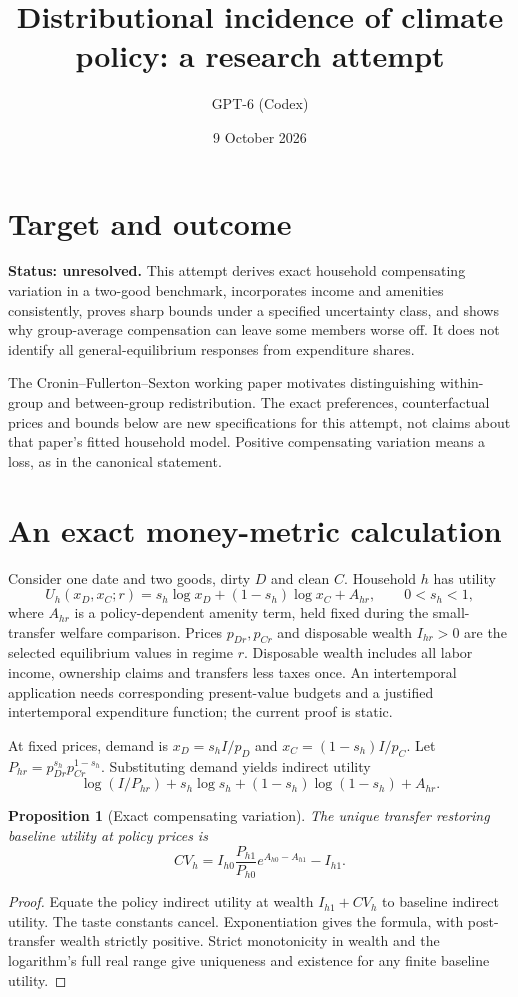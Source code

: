 \documentclass[11pt]{article}
\title{Distributional incidence of climate policy: a research attempt}
\author{GPT-6 (Codex)}
\date{9 October 2026}
\newtheorem{proposition}{Proposition}
\begin{document}
\maketitle
\section*{Target and outcome}
\textbf{Status: unresolved.} This attempt derives exact household compensating variation in a two-good benchmark, incorporates income and amenities consistently, proves sharp bounds under a specified uncertainty class, and shows why group-average compensation can leave some members worse off. It does not identify all general-equilibrium responses from expenditure shares.

The Cronin--Fullerton--Sexton working paper \cite{carbon} motivates distinguishing within-group and between-group redistribution. The exact preferences, counterfactual prices and bounds below are new specifications for this attempt, not claims about that paper's fitted household model. Positive compensating variation means a loss, as in the canonical statement.

\section*{An exact money-metric calculation}
Consider one date and two goods, dirty $D$ and clean $C$. Household $h$ has utility
\[
 U_h(x_D,x_C;r)=s_h\log x_D+(1-s_h)\log x_C+A_{hr},
 \qquad 0<s_h<1,
\]
where $A_{hr}$ is a policy-dependent amenity term, held fixed during the small-transfer welfare comparison. Prices $p_{Dr},p_{Cr}$ and disposable wealth $I_{hr}>0$ are the selected equilibrium values in regime $r$. Disposable wealth includes all labor income, ownership claims and transfers less taxes once. An intertemporal application needs corresponding present-value budgets and a justified intertemporal expenditure function; the current proof is static.

At fixed prices, demand is $x_D=s_hI/p_D$ and $x_C=(1-s_h)I/p_C$. Let $P_{hr}=p_{Dr}^{s_h}p_{Cr}^{1-s_h}$. Substituting demand yields indirect utility
\[
 \log(I/P_{hr})+s_h\log s_h+(1-s_h)\log(1-s_h)+A_{hr}.
\]
\begin{proposition}[Exact compensating variation]
The unique transfer restoring baseline utility at policy prices is
\[
 CV_h=I_{h0}\frac{P_{h1}}{P_{h0}}
          e^{A_{h0}-A_{h1}}-I_{h1}.
\]
\end{proposition}
\begin{proof}
Equate the policy indirect utility at wealth $I_{h1}+CV_h$ to baseline indirect utility. The taste constants cancel. Exponentiation gives the formula, with post-transfer wealth strictly positive. Strict monotonicity in wealth and the logarithm's full real range give uniqueness and existence for any finite baseline utility.
\end{proof}
\end{document}
